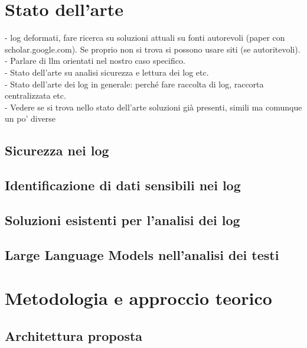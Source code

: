 \documentclass[12pt]{report}
\begin{document}
%
%

\chapter{Stato dell'arte}
\label{chap:stato_arte}

- log deformati, fare ricerca su soluzioni attuali su fonti autorevoli (paper con scholar.google.com). Se proprio non si trova si possono usare siti (se autoritevoli).\\
- Parlare di llm orientati nel nostro caso specifico.\\
- Stato dell'arte su analisi sicurezza e lettura dei log etc.\\
- Stato dell'arte dei log in generale: perché fare raccolta di log, raccorta centralizzata etc.\\
- Vedere se si trova nello stato dell'arte soluzioni già presenti, simili ma comunque un po' diverse

\section{Sicurezza nei log}
\label{sec:sicurezza_log}
\section{Identificazione di dati sensibili nei log}
\label{sec:identificazione_dati_sensibili}
\section{Soluzioni esistenti per l'analisi dei log}
\label{sec:soluzioni_esistenti}
\section{Large Language Models nell'analisi dei testi}
\label{sec:llm_analisi_testi}



\chapter{Metodologia e approccio teorico}
\label{chap:metodologia_teorica}

\section{Architettura proposta}
\label{sec:architettura_proposta}
\end{document}

